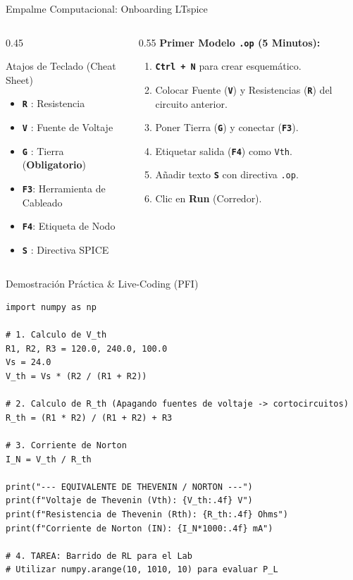\documentclass[aspectratio=169, 10pt]{beamer}
\newcommand{\tecla}[1]{\colorbox{gray!20}{\texttt{\footnotesize\textbf{#1}}}}
\begin{document}
\begin{frame}{Empalme Computacional: Onboarding LTspice}
    \begin{columns}
        \begin{column}{0.45\textwidth}
            \begin{block}{Atajos de Teclado (Cheat Sheet)}
                \begin{itemize}
                    \item \tecla{R} : Resistencia
                    \item \tecla{V} : Fuente de Voltaje
                    \item \tecla{G} : Tierra (\textbf{Obligatorio})
                    \item \tecla{F3}: Herramienta de Cableado
                    \item \tecla{F4}: Etiqueta de Nodo
                    \item \tecla{S} : Directiva SPICE
                \end{itemize}
            \end{block}
        \end{column}
        \begin{column}{0.55\textwidth}
            \textbf{Primer Modelo \texttt{.op} (5 Minutos):}
            \begin{enumerate}
                \item \tecla{Ctrl + N} para crear esquemático.
                \item Colocar Fuente (\tecla{V}) y Resistencias (\tecla{R}) del circuito anterior.
                \item Poner Tierra (\tecla{G}) y conectar (\tecla{F3}).
                \item Etiquetar salida (\tecla{F4}) como \texttt{Vth}.
                \item Añadir texto \tecla{S} con directiva \texttt{.op}.
                \item Clic en \textbf{Run} (Corredor).
            \end{enumerate}
        \end{column}
    \end{columns}
\end{frame}

\begin{frame}[fragile]{Demostración Práctica \& Live-Coding (PFI)}
\begin{lstlisting}
import numpy as np

# 1. Calculo de V_th
R1, R2, R3 = 120.0, 240.0, 100.0
Vs = 24.0
V_th = Vs * (R2 / (R1 + R2))

# 2. Calculo de R_th (Apagando fuentes de voltaje -> cortocircuitos)
R_th = (R1 * R2) / (R1 + R2) + R3

# 3. Corriente de Norton
I_N = V_th / R_th

print("--- EQUIVALENTE DE THEVENIN / NORTON ---")
print(f"Voltaje de Thevenin (Vth): {V_th:.4f} V")
print(f"Resistencia de Thevenin (Rth): {R_th:.4f} Ohms")
print(f"Corriente de Norton (IN): {I_N*1000:.4f} mA")

# 4. TAREA: Barrido de RL para el Lab
# Utilizar numpy.arange(10, 1010, 10) para evaluar P_L
\end{lstlisting}
\end{frame}
\end{document}
